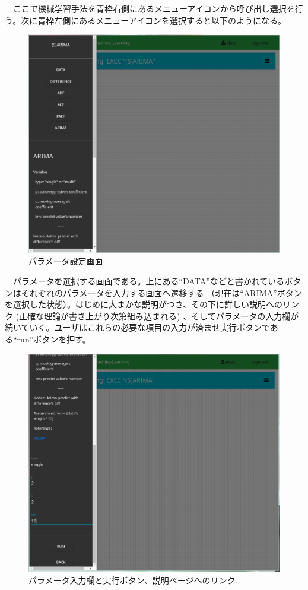 \documentclass{scrartcl}
\begin{document}
　ここで機械学習手法を青枠右側にあるメニューアイコンから呼び出し選択を行う。次に青枠左側にあるメニューアイコンを選択すると以下のようになる。\\

\begin{figure}[htbp]
\centering
\includegraphics[width=12cm]{./settings-view.PNG}
\caption{パラメータ設定画面}
\end{figure}

　パラメータを選択する画面である。上にある``DATA''などと書かれているボタンはそれぞれのパラメータを入力する画面へ遷移する （現在は``ARIMA''ボタンを選択した状態）。はじめに大まかな説明がつき、その下に詳しい説明へのリンク (正確な理論が書き上がり次第組み込まれる) 、そしてパラメータの入力欄が続いていく。ユーザはこれらの必要な項目の入力が済ませ実行ボタンである``run''ボタンを押す。\\

\begin{figure}[htbp]
\centering
\includegraphics[width=.9\linewidth]{./settings-view2.PNG}
\caption{パラメータ入力欄と実行ボタン、説明ページへのリンク}
\end{figure}
\end{document}
